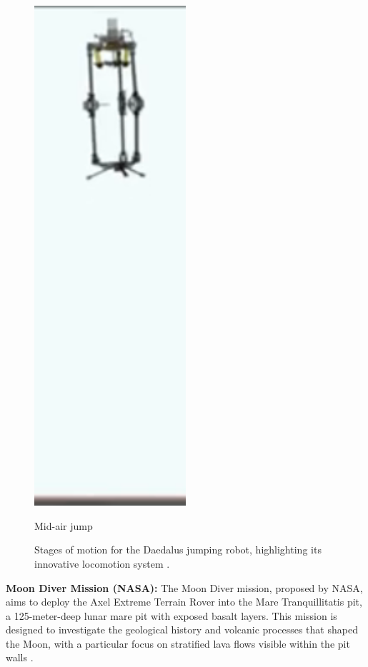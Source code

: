 \begin{figure}[H]
\begin{minipage}[b]{0.2\textwidth}
        \includegraphics[width=0.5\textwidth]{daedalus-jumper-3.png}
        \caption*{Mid-air jump}
    \end{minipage}
    \caption{Stages of motion for the Daedalus jumping robot, highlighting its innovative locomotion system \cite{esa-daedalus}.}
    \label{fig:lunar_robot_movement}
\end{figure}


\textbf{Moon Diver Mission (NASA):}  
The Moon Diver mission, proposed by NASA, aims to deploy the Axel Extreme Terrain Rover into the Mare Tranquillitatis pit, a 125-meter-deep lunar mare pit with exposed basalt layers. This mission is designed to investigate the geological history and volcanic processes that shaped the Moon, with a particular focus on stratified lava flows visible within the pit walls \cite{kerber2023, nesnas2019}.

